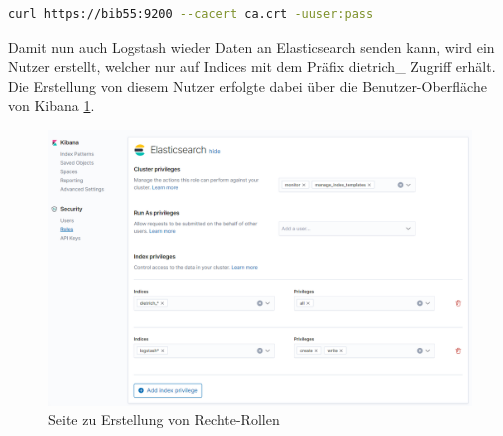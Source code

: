 \begin{lstlisting}[language=BASH, frame=single, label={lst:curlQuery}, caption=Curl-Abfrage an das Elasticsearch-System,captionpos=b] 
curl https://bib55:9200 --cacert ca.crt -uuser:pass
\end{lstlisting}

Damit nun auch Logstash wieder Daten an Elasticsearch senden kann, wird ein Nutzer erstellt, welcher nur auf Indices mit dem Präfix dietrich\_ Zugriff erhält. Die Erstellung von diesem Nutzer erfolgte dabei über die Benutzer-Oberfläche von Kibana \ref{img:kibanaRoles}. 

\begin{figure}
	\centering
	\includegraphics[width=1\linewidth]{images/setup/kibana_roles.png}
	\caption{Seite zu Erstellung von Rechte-Rollen}
	\label{img:kibanaRoles}
\end{figure}